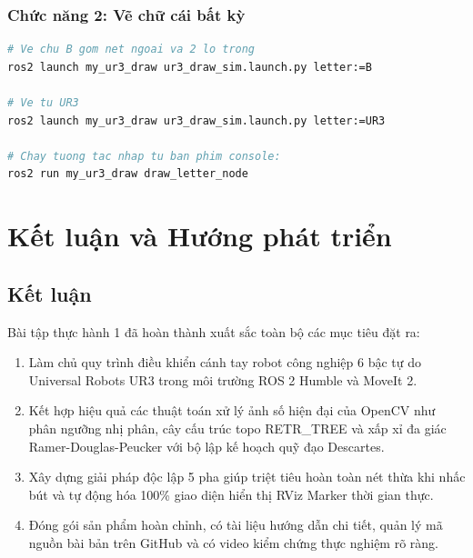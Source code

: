 \documentclass[a4paper,12pt]{article}
\begin{document}
\subsubsection{Chức năng 2: Vẽ chữ cái bất kỳ}
\begin{lstlisting}[language=bash, caption={Lệnh chạy trọn gói chức năng 2 vẽ chữ cái bất kỳ}]
# Ve chu B gom net ngoai va 2 lo trong
ros2 launch my_ur3_draw ur3_draw_sim.launch.py letter:=B

# Ve tu UR3
ros2 launch my_ur3_draw ur3_draw_sim.launch.py letter:=UR3

# Chay tuong tac nhap tu ban phim console:
ros2 run my_ur3_draw draw_letter_node
\end{lstlisting}

\section{Kết luận và Hướng phát triển}

\subsection{Kết luận}
Bài tập thực hành 1 đã hoàn thành xuất sắc toàn bộ các mục tiêu đặt ra:
\begin{enumerate}
    \item Làm chủ quy trình điều khiển cánh tay robot công nghiệp 6 bậc tự do Universal Robots UR3 trong môi trường ROS 2 Humble và MoveIt 2.
    \item Kết hợp hiệu quả các thuật toán xử lý ảnh số hiện đại của OpenCV như phân ngưỡng nhị phân, cây cấu trúc topo RETR\_TREE và xấp xỉ đa giác Ramer-Douglas-Peucker với bộ lập kế hoạch quỹ đạo Descartes.
    \item Xây dựng giải pháp độc lập 5 pha giúp triệt tiêu hoàn toàn nét thừa khi nhấc bút và tự động hóa 100\% giao diện hiển thị RViz Marker thời gian thực.
    \item Đóng gói sản phẩm hoàn chỉnh, có tài liệu hướng dẫn chi tiết, quản lý mã nguồn bài bản trên GitHub và có video kiểm chứng thực nghiệm rõ ràng.
\end{enumerate}
\end{document}
